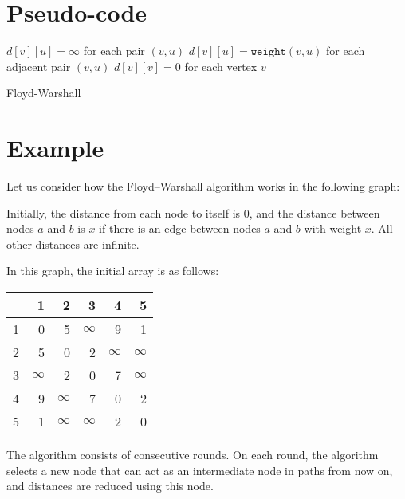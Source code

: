 \documentclass[twoside,12pt,a4paper,english]{book}
\theoremstyle{definition}
\theoremstyle{problemstyle}
\begin{document}
\section{Pseudo-code}

\begin{algorithm}[H]
\SetAlgoLined
{}
 $d[v][u] = \infty$ for each pair $(v,u)$\;
 $d[v][u] = \texttt{weight}(v,u)$ for each adjacent pair $(v,u)$\;
 $d[v][v] = 0$ for each vertex $v$\;
 \caption{Floyd-Warshall}
\end{algorithm}

\section{Example}

Let us consider how the Floyd–Warshall algorithm
works in the following graph:

\begin{center}
\end{center}

Initially, the distance from each node to itself is $0$,
and the distance between nodes $a$ and $b$ is $x$
if there is an edge between nodes $a$ and $b$ with weight $x$.
All other distances are infinite.

In this graph, the initial array is as follows:
\begin{center}
\begin{tabular}{r|rrrrr}
 & 1 & 2 & 3 & 4 & 5 \\
\hline
1 & 0 & 5 & $\infty$ & 9 & 1 \\
2 & 5 & 0 & 2 & $\infty$ & $\infty$ \\
3 & $\infty$ & 2 & 0 & 7 & $\infty$ \\
4 & 9 & $\infty$ & 7 & 0 & 2 \\
5 & 1 & $\infty$ & $\infty$ & 2 & 0 \\
\end{tabular}
\end{center}
\vspace{10pt}
The algorithm consists of consecutive rounds.
On each round, the algorithm selects a new node
that can act as an intermediate node in paths from now on,
and distances are reduced using this node.
\end{document}
